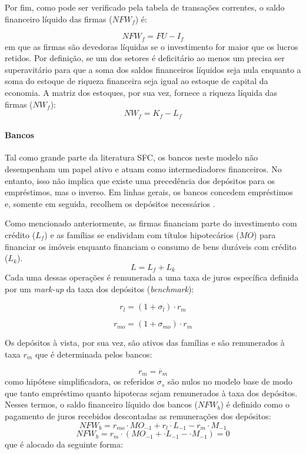 Por fim, como pode ser verificado pela tabela de transações correntes, o saldo financeiro líquido das firmas ($NFW_f$) é:

\begin{equation}
    NFW_f = FU - I_f
\end{equation}
em que as firmas são devedoras líquidas se o investimento for maior que os lucros retidos. Por definição, se um dos setores é deficitário ao menos um precisa ser superavitário para que a soma dos saldos financeiros líquidos seja nula enquanto a soma do estoque de riqueza financeira seja igual ao estoque de capital da economia. A matriz dos estoques, por sua vez, fornece a riqueza líquida das firmas ($NW_f$):
\begin{equation}
    NW_f = K_f - L_f
\end{equation}

\paragraph*{Bancos} Tal como grande parte da literatura SFC, os bancos neste modelo não desempenham um papel ativo e atuam como intermediadores financeiros. No entanto, isso não implica que existe uma precedência dos depósitos para os empréstimos, mas o inverso. Em linhas gerais, os bancos concedem empréstimos e, somente em seguida, recolhem os depósitos necessários \cite{le_bourva_money_1992}. 

Como mencionado anteriormente, as firmas financiam parte do investimento com crédito ($L_f$) e as famílias se endividam com títulos hipotecários ($MO$) para financiar os imóveis enquanto financiam o consumo de bens duráveis com crédito ($L_k$). 
\begin{equation}
L = L_f + L_k
\end{equation}
Cada uma dessas operações é remunerada a uma taxa de juros específica definida por um \textit{mark-up} da taxa dos depósitos (\textit{benchmark}):

\begin{equation}
    r_l = (1+\sigma_l)\cdot r_m
\end{equation}

\begin{equation}
    r_{mo} = (1+\sigma_{mo})\cdot r_m
\end{equation}

Os depósitos à vista, por sua vez, são ativos das famílias e são remunerados à taxa $r_m$ que é determinada pelos bancos:

\begin{equation}
    r_m = \overline r_m
\end{equation}
como hipótese simplificadora, os referidos $\sigma_s$ são nulos no modelo base de modo que tanto empréstimo quanto hipotecas sejam remunerados à taxa dos depósitos. Nesses termos, o saldo financeiro líquido dos bancos ($NFW_b$) é definido como o pagamento de juros recebidos descontadas as remunerações dos depósitos:
\begin{equation}
    NFW_b = r_{mo}\cdot MO_{-1} + r_l\cdot L_{-1} - r_m\cdot M_{-1}
\end{equation}
$$
    NFW_b = r_{m}\cdot (MO_{-1} + \cdot L_{-1} - \cdot M_{-1}) = 0
$$
que é alocado da seguinte forma:

